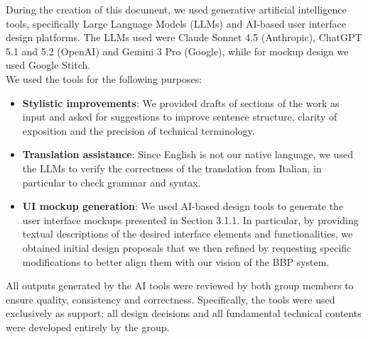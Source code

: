 \noindent
During the creation of this document, we used generative artificial intelligence tools, specifically Large Language Models (LLMs) and AI-based user interface design platforms. The LLMs used were Claude Sonnet 4.5 (Anthropic), ChatGPT 5.1 and 5.2 (OpenAI) and Gemini 3 Pro (Google), while for mockup design we used Google Stitch. \\
We used the tools for the following purposes: \\
\begin{itemize}
    \item[] \textbf{Stylistic improvements}: We provided drafts of sections of the work as input and asked for suggestions to improve sentence structure, clarity of exposition and the precision of technical terminology.
    
    \item[] \textbf{Translation assistance}: Since English is not our native language, we used the LLMs to verify the correctness of the translation from Italian, in particular to check grammar and syntax.
    
    \item[] \textbf{UI mockup generation}: We used AI-based design tools to generate the user interface mockups presented in Section 3.1.1. In particular, by providing textual descriptions of the desired interface elements and functionalities, we obtained initial design proposals that we then refined by requesting specific modifications to better align them with our vision of the BBP system.
\end{itemize}
All outputs generated by the AI tools were reviewed by both group members to ensure quality, consistency and correctness. Specifically, the tools were used exclusively as support: all design decisions and all fundamental technical contents were developed entirely by the group.